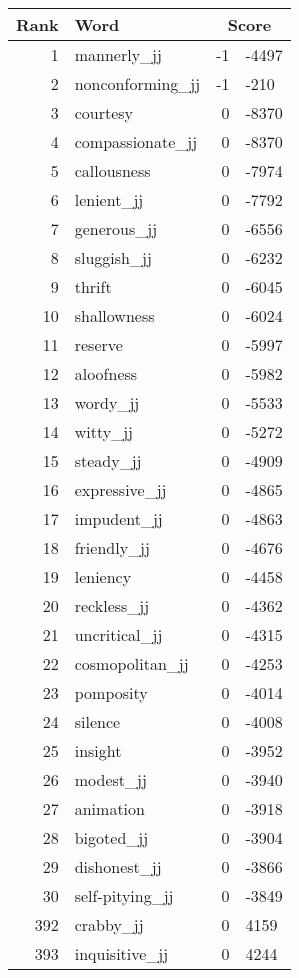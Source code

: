 \begin{longtable}[!htbp]{| rlr@{.}l |}
    \hline
    \textbf{Rank} & \textbf{Word} & \multicolumn{2}{c|}{\textbf{Score}} \\
    \hline
    \endhead
    1 & mannerly\_jj & -1 & -4497 \\
    2 & nonconforming\_jj & -1 & -210 \\
    3 & courtesy & 0 & -8370 \\
    4 & compassionate\_jj & 0 & -8370 \\
    5 & callousness & 0 & -7974 \\
    6 & lenient\_jj & 0 & -7792 \\
    7 & generous\_jj & 0 & -6556 \\
    8 & sluggish\_jj & 0 & -6232 \\
    9 & thrift & 0 & -6045 \\
    10 & shallowness & 0 & -6024 \\
    11 & reserve & 0 & -5997 \\
    12 & aloofness & 0 & -5982 \\
    13 & wordy\_jj & 0 & -5533 \\
    14 & witty\_jj & 0 & -5272 \\
    15 & steady\_jj & 0 & -4909 \\
    16 & expressive\_jj & 0 & -4865 \\
    17 & impudent\_jj & 0 & -4863 \\
    18 & friendly\_jj & 0 & -4676 \\
    19 & leniency & 0 & -4458 \\
    20 & reckless\_jj & 0 & -4362 \\
    21 & uncritical\_jj & 0 & -4315 \\
    22 & cosmopolitan\_jj & 0 & -4253 \\
    23 & pomposity & 0 & -4014 \\
    24 & silence & 0 & -4008 \\
    25 & insight & 0 & -3952 \\
    26 & modest\_jj & 0 & -3940 \\
    27 & animation & 0 & -3918 \\
    28 & bigoted\_jj & 0 & -3904 \\
    29 & dishonest\_jj & 0 & -3866 \\
    30 & self-pitying\_jj & 0 & -3849 \\
    392 & crabby\_jj & 0 & 4159 \\
    393 & inquisitive\_jj & 0 & 4244 \\

\end{longtable}
